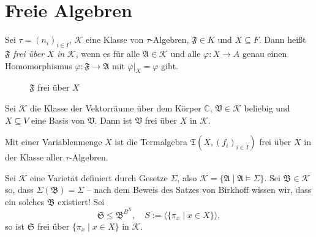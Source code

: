 \section{Freie Algebren}

\begin{definition}
Sei $ \tau = (n_i)_{i \in I}$, $\mathcal{K}$ eine Klasse von $\tau$-Algebren, $\mathfrak{F} \in K$ und $X \subseteq F$. Dann heißt $\mathfrak{F}$ \emph{frei über} $X$ \emph{in} $\mathcal{K}$, wenn es für alle $\mathfrak{A} \in \mathcal{K}$ und alle $\varphi : X \to A$ genau einen Homomorphismus $\overline{\varphi} : \mathfrak{F} \to \mathfrak{A}$ mit $\overline{\varphi} \vert_X = \varphi$ gibt.

\begin{figure}[H]
    \centering
    \caption{$\mathfrak{F}$ frei über $X$}
\end{figure}
\end{definition}

\begin{example}
    Sei $\mathcal{K}$ die Klasse der Vektorräume über dem Körper $\mathbb{C}$, $\mathfrak{V} \in \mathcal{K}$ beliebig und $X \subseteq V$ eine Basis von $\mathfrak{V}$. Dann ist $\mathfrak{V}$ frei über $X$ in $\mathcal{K}$.

    Mit einer Variablenmenge $X$ ist die Termalgebra $\mathfrak{T}(X, (f_i)_{i \in I})$ frei über $X$ in der Klasse aller $\tau$-Algebren.
\end{example}

\begin{example}
    Sei $\mathcal{K}$ eine Varietät definiert durch Gesetze $\Sigma$, also $\mathcal{K} = \{ \mathfrak{A} \mid \mathfrak{A} \models \Sigma \}$. Sei $\mathfrak{B} \in \mathcal{K}$ so, dass $\Sigma(\mathfrak{B}) = \Sigma$ -- nach dem Beweis des Satzes von Birkhoff wissen wir, dass ein solches $\mathfrak{B}$ existiert! Sei
    $$ \mathfrak{S} \leq \mathfrak{B}^{B^X}, \quad S := \langle \{ \pi_x \mid x \in X \} \rangle, $$
    so ist $\mathfrak{S}$ frei über $\{ \pi_x \mid x \in X \}$ in $\mathcal{K}$.
\end{example}

